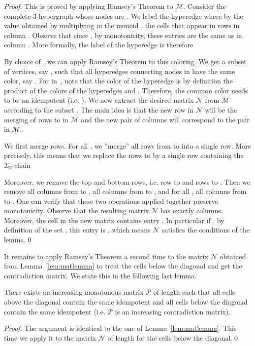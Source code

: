 \documentclass[envcountsame]{llncs}
\newcommand\mat{\ensuremath{\mathscr{M}}\xspace}
\newcommand\mnat{\ensuremath{\mathscr{N}}\xspace}
\newcommand\pat{\ensuremath{\mathscr{P}}\xspace}
\newcommand{\sic}[1]{\ensuremath{\Sigma_{#1}}\xspace}
\newcommand\qchain[1]{\ensuremath{\sic{#1}}-chain\xspace}
\newcommand\dchain{\qchain{2}}
\begin{document}
\begin{proof}
  This is proved by applying Ramsey's Theorem to \mat. Consider the
  complete 3-hypergraph whose nodes are . We label the
  hyperedge  where   by the value obtained by
  multiplying in the monoid , the cells that appear in rows
   in column . Observe that since , by monotonicity, these entries are the
  same as in column . More formally, the label of the hyperedge  is therefore
  
  By choice of , we can apply Ramsey's Theorem to this coloring. We get a
  subset of  vertices, say , such that all hyperedges connecting nodes in  have the same
  color, say . For  in~, note that the color of the hyperedge
   is by definition the product of the colors of the hyperedges 
   and . Therefore, the common color  needs to be an idempotent
  (i.e. ). We now extract the desired matrix \mnat from \mat according
  to the subset . The main idea is that the new row  in \mnat will be the
  merging of rows  to  in \mat and the new pair of columns
   will correspond to the pair  in \mat.

  We first merge rows. For all , we ''merge'' all rows from
   to  into a single row. More precisely, this means
  that we replace the rows  to  by a single row
  containing the \dchain 
  

  Moreover, we remove the top and bottom rows, i.e. row  to  and
  rows  to . Then we remove all columns from  to
  , all columns from  to , and for all , all columns from  to . One can verify
  that these two operations applied together preserve
  monotonicity. Observe that the resulting matrix \mnat has exactly
   columns. Moreover, the cell  in the new
  matrix contains entry . In particular if , by definition of
  the set , this entry is , which means \mnat satisfies the
  conditions of the lemma.\qed
\end{proof}

It remains to apply Ramsey's Theorem a second time to the matrix \mnat
obtained from Lemma~\ref{lem:matlemma} to treat the cells below the
diagonal and get the contradiction matrix. We state this in the
following last lemma.


\begin{lemma}
  There exists an increasing monotonous matrix \pat of length  such
  that all cells above the diagonal contain the same idempotent  and all cells below the diagonal contain the same idempotent  (i.e. \pat is an increasing contradiction matrix). 
\end{lemma}

\begin{proof}
  The argument is identical to the one of Lemma~\ref{lem:matlemma}. This
  time we apply it to the matrix \mnat of length  for the
  cells below the diagonal.\qed
\end{proof}
\end{document}
